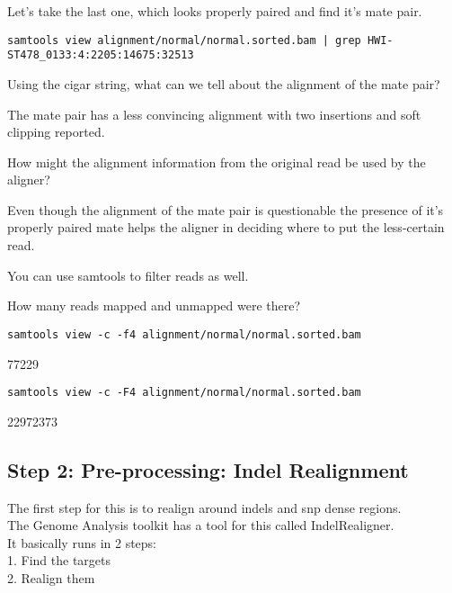 \begin{question} 
Let's take the last one, which looks properly paired and find it's mate pair. \\
[HINT: Instead of using 'head' what unix command could we pipe the otput to?]
\end{question}
\begin{answer}
\begin{lstlisting}
samtools view alignment/normal/normal.sorted.bam | grep HWI-ST478_0133:4:2205:14675:32513
\end{lstlisting}
\end{answer}

\begin{question} 
Using the cigar string, what can we tell about the alignment of the mate pair?
\end{question}
\begin{answer}
The mate pair has a less convincing alignment with two insertions and soft clipping reported.
\end{answer}

\begin{question} 
How might the alignment information from the original read be used by the aligner?
\end{question}
\begin{answer}
Even though the alignment of the mate pair is questionable the presence of it's properly paired mate helps the aligner in deciding where to put the less-certain read. 
\end{answer}

You can use samtools to filter reads as well.

\begin{question} 
How many reads mapped and unmapped were there? \\
[HINT: Look at the samtools view help menu by typing samtools view without any arguments]
\end{question}
\begin{answer}
\begin{lstlisting}
samtools view -c -f4 alignment/normal/normal.sorted.bam
\end{lstlisting}
77229
\begin{lstlisting}
samtools view -c -F4 alignment/normal/normal.sorted.bam
\end{lstlisting}
22972373
\end{answer}

\subsection{Step 2: Pre-processing: Indel Realignment}
The first step for this is to realign around indels and snp dense regions.\\
The Genome Analysis toolkit has a tool for this called IndelRealigner. \\
It basically runs in 2 steps: \\
   1. Find the targets \\
   2. Realign them \\


